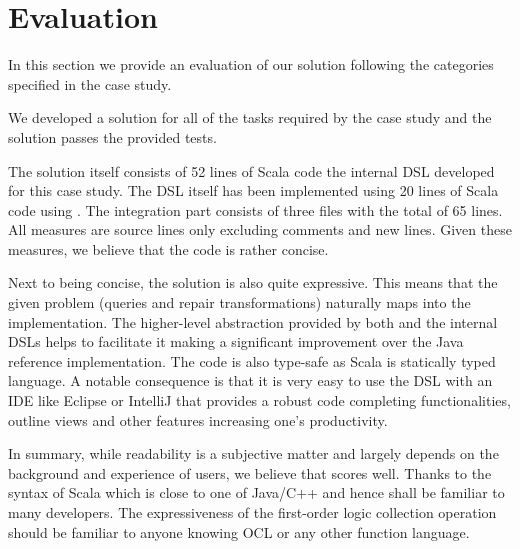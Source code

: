 

\section{Evaluation}
\label{sec:Evaluation}

In this section we provide an evaluation of our solution following the categories specified in the case study.

%
We developed a solution for all of the tasks required by the case study and the solution passes the provided tests.

%
The solution itself consists of 52 lines of Scala code the internal DSL developed for this case study.
The DSL itself has been implemented using 20 lines of Scala code using \SIGMA.
The integration part consists of three files with the total of 65 lines.
All measures are source lines only excluding comments and new lines.
Given these measures, we believe that the code is rather concise.

%
Next to being concise, the solution is also quite expressive.
This means that the given problem (queries and repair transformations) naturally maps into the implementation.
The higher-level abstraction provided by both \SIGMA and the internal DSLs helps to facilitate it making a significant improvement over the Java reference implementation.
%
The code is also type-safe as Scala is statically typed language.
A notable consequence is that it is very easy to use the DSL with an IDE like Eclipse or IntelliJ that provides a robust code completing functionalities, outline views and other features increasing one's productivity.

In summary, while readability is a subjective matter and largely depends on the background and experience of users, we believe that \SIGMA scores well.
Thanks to the syntax of Scala which is close to one of Java/C++ and hence shall be familiar to many developers.
The expressiveness of the first-order logic collection operation should be familiar to anyone knowing OCL or any other function language.


